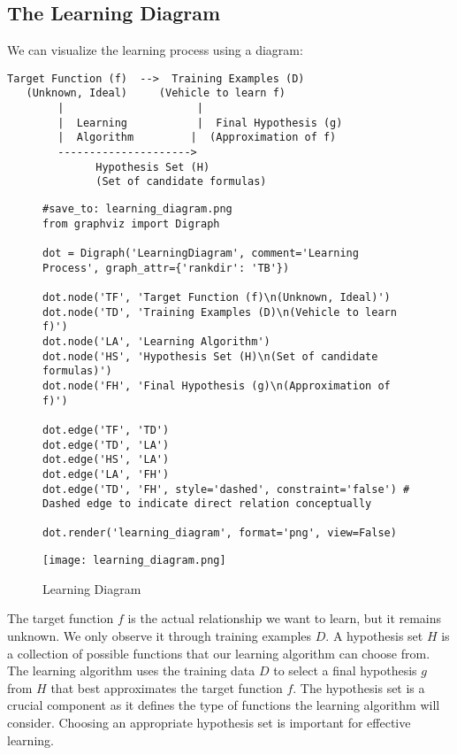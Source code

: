 \documentclass{article}
\begin{document}
\subsection{The Learning Diagram}
We can visualize the learning process using a diagram:

\begin{verbatim}
Target Function (f)  -->  Training Examples (D)
   (Unknown, Ideal)     (Vehicle to learn f)
        |                     |
        |  Learning           |  Final Hypothesis (g)
        |  Algorithm         |  (Approximation of f)
        --------------------->
              Hypothesis Set (H)
              (Set of candidate formulas)
\end{verbatim}


\begin{figure}[H]
    \centering
    \begin{verbatim}
#save_to: learning_diagram.png
from graphviz import Digraph

dot = Digraph('LearningDiagram', comment='Learning Process', graph_attr={'rankdir': 'TB'})

dot.node('TF', 'Target Function (f)\n(Unknown, Ideal)')
dot.node('TD', 'Training Examples (D)\n(Vehicle to learn f)')
dot.node('LA', 'Learning Algorithm')
dot.node('HS', 'Hypothesis Set (H)\n(Set of candidate formulas)')
dot.node('FH', 'Final Hypothesis (g)\n(Approximation of f)')

dot.edge('TF', 'TD')
dot.edge('TD', 'LA')
dot.edge('HS', 'LA')
dot.edge('LA', 'FH')
dot.edge('TD', 'FH', style='dashed', constraint='false') # Dashed edge to indicate direct relation conceptually

dot.render('learning_diagram', format='png', view=False)
    \end{verbatim}
    \texttt{[image: learning\_diagram.png]}
    \caption{Learning Diagram}
    \label{fig:learning_diagram}
\end{figure}


The target function $f$ is the actual relationship we want to learn, but it remains unknown. We only observe it through training examples $D$.  A hypothesis set $H$ is a collection of possible functions that our learning algorithm can choose from. The learning algorithm uses the training data $D$ to select a final hypothesis $g$ from $H$ that best approximates the target function $f$.  The hypothesis set is a crucial component as it defines the type of functions the learning algorithm will consider. Choosing an appropriate hypothesis set is important for effective learning.
\end{document}
